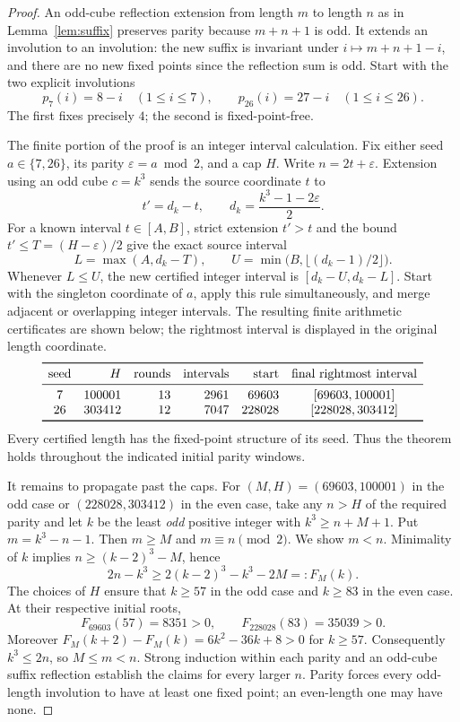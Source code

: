\documentclass[9pt]{extarticle}
\begin{document}
\begin{proof}
An odd-cube reflection extension from length $m$ to length $n$ as in
Lemma~\ref{lem:suffix} preserves parity because $m+n+1$ is odd. It
extends an involution to an involution: the new suffix is invariant under
$i\mapsto m+n+1-i$, and there are no new fixed points since the
reflection sum is odd. Start with the two explicit involutions
\[
 p_7(i)=8-i\quad(1\le i\le7),\qquad
 p_{26}(i)=27-i\quad(1\le i\le26).
\]
The first fixes precisely $4$; the second is fixed-point-free.

The finite portion of the proof is an integer interval calculation. Fix either seed $a\in\{7,26\}$,
its parity $\varepsilon=a\bmod2$, and a cap $H$. Write
$n=2t+\varepsilon$. Extension using an odd cube $c=k^3$ sends the
source coordinate $t$ to
\[
 t'=d_k-t,\qquad d_k=\frac{k^3-1-2\varepsilon}{2}.
\]
For a known interval $t\in[A,B]$, strict extension $t'>t$ and the
bound $t'\le T=(H-\varepsilon)/2$ give the exact source interval
\[
 L=\max(A,d_k-T),\qquad
 U=\min\bigl(B,\lfloor(d_k-1)/2\rfloor\bigr).
\]
Whenever $L\le U$, the new certified integer interval is
$[d_k-U,d_k-L]$. Start with the singleton coordinate of $a$, apply
this rule simultaneously, and merge adjacent or overlapping integer
intervals. The resulting finite arithmetic certificates are shown below;
the rightmost interval is displayed in the original length coordinate.
\[
\begin{array}{crrrrc}\toprule
\text{seed}&H&\text{rounds}&\text{intervals}&\text{start}&
\text{final rightmost interval}\\\midrule
7&100001&13&2961&69603&[69603,100001]\\
26&303412&12&7047&228028&[228028,303412]\\\bottomrule
\end{array}
\]
Every certified length has the fixed-point structure of its seed.
Thus the theorem holds throughout the indicated initial parity windows.

It remains to propagate past the caps. For $(M,H)=(69603,100001)$
in the odd case or $(228028,303412)$ in the even case, take any
$n>H$ of the required parity and let $k$ be the least \emph{odd}
positive integer with $k^3\ge n+M+1$. Put $m=k^3-n-1$.
Then $m\ge M$ and $m\equiv n\pmod2$. We show $m<n$.
Minimality of $k$ implies
$n\ge(k-2)^3-M$, hence
\[
 2n-k^3\ge2(k-2)^3-k^3-2M=:F_M(k).
\]
The choices of $H$ ensure that $k\ge57$ in the odd case and
$k\ge83$ in the even case. At their respective initial roots,
\[
 F_{69603}(57)=8351>0,\qquad F_{228028}(83)=35039>0.
\]
Moreover $F_M(k+2)-F_M(k)=6k^2-36k+8>0$ for $k\ge57$.
Consequently $k^3\le2n$, so $M\le m<n$. Strong induction within
each parity and an odd-cube suffix reflection establish the claims
for every larger $n$. Parity forces every odd-length involution to
have at least one fixed point; an even-length one may have none.
\end{proof}
\end{document}
